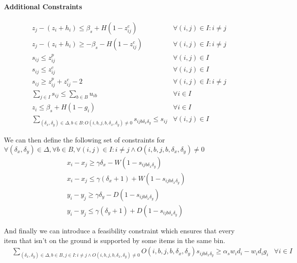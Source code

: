 \paragraph*{Additional Constraints}
\begin{eqnarray}
    & z_j - (z_i + h_i) \le \beta_s + H (1 - z^c_{ij}) & \forall (i, j) \in I : i \neq j \label{cons:z_close_1} \\
    & z_j - (z_i + h_i) \ge -\beta_s - H (1 - z^c_{ij}) & \forall (i, j) \in I : i \neq j \label{cons:z_close_2} \\
    & s_{ij} \le z^p_{ij} & \forall (i, j) \in I  \label{cons:supporting_1} \\
    & s_{ij} \le z^c_{ij} & \forall (i, j) \in I  \label{cons:supporting_2} \\
    & s_{ij} \ge z^p_{ij} + z^c_{ij} - 2 & \forall (i, j) \in I : i \neq j \label{cons:supporting} \\
    & \sum\limits_{j \in I}{s_{ij}} \le \sum\limits_{b \in B}{u_{ib}} & \forall i \in I  \label{cons:support_comes_from_placed} \\
    & z_i \le \beta_s + H(1 - g_i) & \forall i \in I \label{cons:grounded} \\
    & \sum\limits_{(\delta_x, \delta_y) \in \Delta, b \in B : O(i, b, j, b, \delta_x, \delta_y) \neq 0} s_{i j b \delta_x \delta_y } \le s_{ij} & \forall (i, j) \in I \label{cons:discretized_support_same}
\end{eqnarray}

We can then define the following set of constraints for $\forall (\delta_x, \delta_y) \in \Delta, \forall b \in B, \forall (i,j) \in I : i \neq j \land O(i, b, j, b, \delta_x, \delta_y) \neq 0$
\begin{eqnarray}
    & x_i - x_j \ge \gamma \delta_x - W( 1 - s_{i j b \delta_x \delta_y}) &  \label{cons:discretized_support_limit_x_1} \\
    & x_i - x_j \le \gamma (\delta_x + 1) + W( 1 - s_{i j b \delta_x \delta_y}) &  \label{cons:discretized_support_limit_x_2} \\
    & y_i - y_j \ge \gamma \delta_y - D( 1 - s_{i j b \delta_x \delta_y}) &  \label{cons:discretized_support_limit_y_1} \\
    & y_i - y_j \le \gamma (\delta_y + 1) + D( 1 - s_{i j b \delta_x \delta_y}) &  \label{cons:discretized_support_limit_y_2}
\end{eqnarray}

And finally we can introduce a feasibility constraint which ensures that every item that isn't on the ground is supported by some items in the same bin.
\begin{eqnarray*}
    & \sum\limits_{(\delta_x, \delta_y) \in \Delta, b \in B, j \in I : i \neq j \land O(i, b, j, b, \delta_x, \delta_y) \neq 0}{ O(i, b, j, b, \delta_x, \delta_y)s_{i j b \delta_x \delta_y }} \ge \alpha_s w_i d_i - w_i d_i g_i & \forall i \in I \label{cons:every_item_is_supported}
\end{eqnarray*}